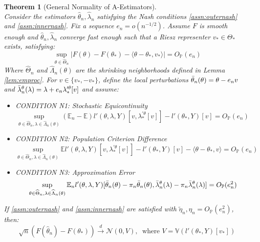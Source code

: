 \documentclass[12pt]{article}
\theoremstyle{myplain}
\newtheorem{theorem}{Theorem}[section]
\theoremstyle{definition}
\theoremstyle{definition}
\theoremstyle{remark}
\numberwithin{equation}{section}
\begin{document}
\begin{theorem}[General Normality of A-Estimators]\label{thm:normality}\ \\
Consider the estimators $\widehat\theta_n, \widehat\lambda_n$ satisfying the Nash conditions \ref{assn:outernash} and \ref{assn:innernash}. Fix a sequence $e_n=o(n^{-1/2})$. Assume $F$ is smooth enough and $\widehat\theta_n, \widehat\lambda_n$ converge fast enough such that a Riesz representer $v_*\in\Theta_*$ exists, satisfying:
\begin{equation}
\label{assn:smoothf}
    \sup_{\theta\in\widehat{\Theta}_n} |F(\theta)-F(\theta_*)-\langle \theta -\theta_*, v_*\rangle| = O_\mathbb{P}(e_n)
\end{equation}
Where $\widehat{\Theta}_n$ and $\widehat{\Lambda}_n(\theta)$ are the shrinking neighborhoods defined in Lemma \ref{lem:emproc}. For $v\in\{v_*, -v_*\}$, define the local perturbations $\Bar{\theta}_n(\theta)=\theta-e_n v$ and $\Bar{\lambda}_n^\theta(\lambda)=\lambda + e_n \lambda^{\prime\theta}_*[v]$ and assume:

\begin{itemize}
\item[] CONDITION N1: Stochastic Equicontinuity
$$
\sup_{\theta\in\widehat{\Theta}_n,\lambda\in\widehat{\Lambda}_n(\theta)} (\mathbb{E}_n-\mathbb{E}) l'(\theta,\lambda, Y)[v,\lambda_*^{\prime\theta}[v]]-l'(\theta_*, Y)[v] = O_\mathbb{P}(e_n)
$$
\item[] CONDITION N2: Population Criterion Difference
$$
\sup_{\theta\in\widehat{\Theta}_n,\lambda\in\widehat{\Lambda}_n(\theta)} \mathbb{E} l'(\theta,\lambda, Y)[v,\lambda_*^{\prime\theta}[v]]-l'(\theta_*, Y)[v] - \langle \theta-\theta_*, v \rangle =  O_\mathbb{P}(e_n) 
$$
\item[] CONDITION N3: Approximation Error
$$
\sup_{\theta\in\widehat{\Theta}_n,\lambda\in\widehat{\Lambda}_n(\theta)} \mathbb{E}_n l'(\theta,\lambda,Y)[\Bar{\theta}_n(\theta)-\pi_n\Bar{\theta}_n(\theta), \Bar{\lambda}_n^\theta(\lambda)-\pi_n\Bar{\lambda}_n^\theta(\lambda)]  = O_\mathbb{P}(e_n^2)
$$

\end{itemize}

If \ref{assn:outernash} and \ref{assn:innernash} are satisfied with $\widetilde\eta_n, \eta_n = O_\mathbb{P}(e_n^2)$, then:
\[\sqrt{n} \left( F(\widehat{\theta}_n)-F(\theta_*)\right) \overset{d}{\longrightarrow} \mathcal{N}(0, V),\ \text{ where }V=\mathbb{V}\left(l'(\theta_*, Y)[v_*]\right)\]
\end{theorem}
\end{document}
